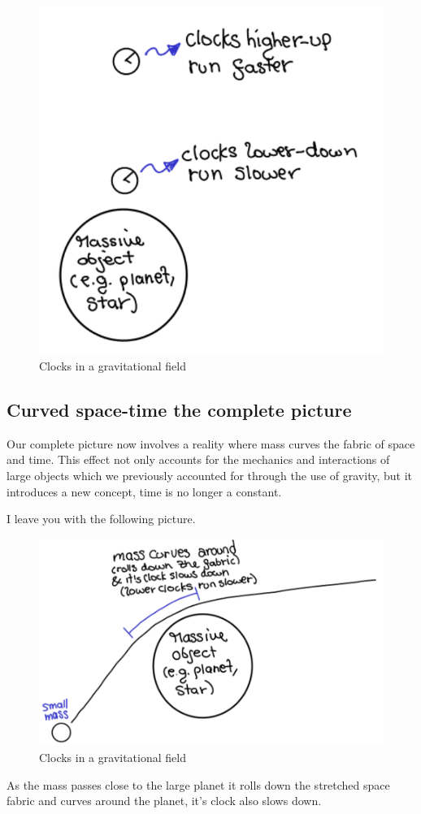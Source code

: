 \documentclass[12pt, letterpaper]{article}
\begin{document}
     \begin{figure}[h!]
        \caption{Clocks in a gravitational field}
        \centering
        \includegraphics[scale=0.3]{planet_slows_clocks.pdf}
    \end{figure} 
    
    \subsection*{Curved space-time the complete picture}
    Our complete picture now involves a reality where mass curves the fabric 
    of space and time. This effect not only accounts for the mechanics and 
    interactions of large objects which we previously accounted for through 
    the use of gravity, but it introduces a new concept, time is no longer 
    a constant. 
    
    I leave you with the following picture.
    
    \begin{figure}[h!]
        \caption{Clocks in a gravitational field}
        \centering
        \includegraphics[scale=0.5]{planet_curves_space_time.pdf}
    \end{figure}    
    
    As the mass passes close to the large planet it rolls down the stretched 
    space fabric and curves around the planet, it's clock also slows down.
    
\end{document}
